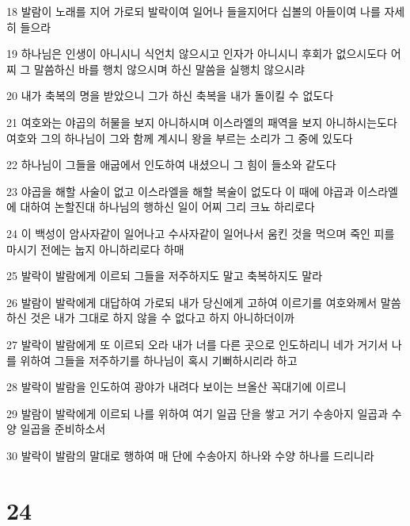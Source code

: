 \par 18 발람이 노래를 지어 가로되 발락이여 일어나 들을지어다 십볼의 아들이여 나를 자세히 들으라
\par 19 하나님은 인생이 아니시니 식언치 않으시고 인자가 아니시니 후회가 없으시도다 어찌 그 말씀하신 바를 행치 않으시며 하신 말씀을 실행치 않으시랴
\par 20 내가 축복의 명을 받았으니 그가 하신 축복을 내가 돌이킬 수 없도다
\par 21 여호와는 야곱의 허물을 보지 아니하시며 이스라엘의 패역을 보지 아니하시는도다 여호와 그의 하나님이 그와 함께 계시니 왕을 부르는 소리가 그 중에 있도다
\par 22 하나님이 그들을 애굽에서 인도하여 내셨으니 그 힘이 들소와 같도다
\par 23 야곱을 해할 사술이 없고 이스라엘을 해할 복술이 없도다 이 때에 야곱과 이스라엘에 대하여 논할진대 하나님의 행하신 일이 어찌 그리 크뇨 하리로다
\par 24 이 백성이 암사자같이 일어나고 수사자같이 일어나서 움킨 것을 먹으며 죽인 피를 마시기 전에는 눕지 아니하리로다 하매
\par 25 발락이 발람에게 이르되 그들을 저주하지도 말고 축복하지도 말라
\par 26 발람이 발락에게 대답하여 가로되 내가 당신에게 고하여 이르기를 여호와께서 말씀하신 것은 내가 그대로 하지 않을 수 없다고 하지 아니하더이까
\par 27 발락이 발람에게 또 이르되 오라 내가 너를 다른 곳으로 인도하리니 네가 거기서 나를 위하여 그들을 저주하기를 하나님이 혹시 기뻐하시리라 하고
\par 28 발락이 발람을 인도하여 광야가 내려다 보이는 브올산 꼭대기에 이르니
\par 29 발람이 발락에게 이르되 나를 위하여 여기 일곱 단을 쌓고 거기 수송아지 일곱과 수양 일곱을 준비하소서
\par 30 발락이 발람의 말대로 행하여 매 단에 수송아지 하나와 수양 하나를 드리니라

\chapter{24}

